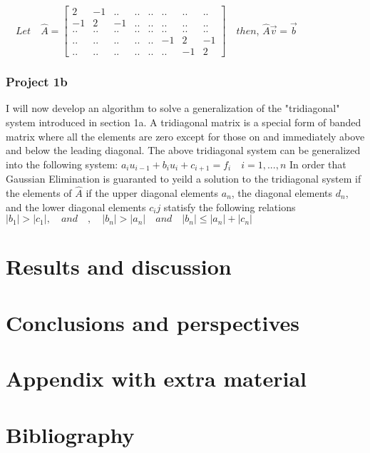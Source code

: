 \documentclass[11pt, oneside]{article}   	%
\begin{document}
\newline\newline
$\quad Let \quad \hat{A} = \begin{bmatrix}
2 & -1 & ..& ..& ..& ..& ..& ..\\
-1 & 2 & -1 & .. & ..& ..& ..& ..\\
.. & .. & ..& ..& ..& ..& ..& ..\\
.. & .. & .. & .. & .. & -1 & 2 & -1\\
.. & .. & .. & .. & .. & .. & -1 & 2
\end{bmatrix}\quad then$,\newline
\newline
$ \hat{A}\vec{v} = \vec{b}$\newline
\newline
\subsubsection{Project 1b}
I will now develop an algorithm to solve a generalization of the "tridiagonal" system introduced in section 1a. A tridiagonal matrix is a special form of banded matrix where all the elements are zero except for those on and immediately above and below the leading diagonal. The above tridiagonal system can be generalized into the following system:\newline
\newline 
$a_iu_{i-1}+b_iu_i+c_{i+1}=f_i\quad i=1,...,n$\newline
\newline
In order that Gaussian Elimination is guaranted to yeild a solution to the tridiagonal system if the elements of $\hat{A}$ if the upper diagonal elements $a_n$, the diagonal elements $d_n$, and the lower diagonal elements $c_{i}{j}$ statisfy the following relations\newline
\newline
$|b_1|>|c_1|,\quad and \quad,\quad|b_n|>|a_n|\quad and \quad|b_n| \le |a_n|+|c_n|$
\section{Results and discussion}
\section{Conclusions and perspectives}
\section{Appendix with extra material}
\section{Bibliography}
\end{document}
